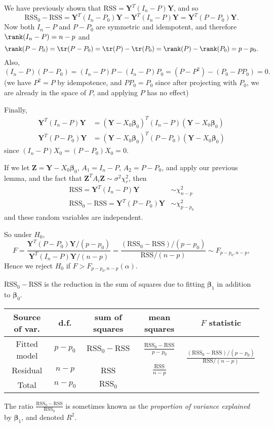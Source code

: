 \documentclass[a4paper]{article}
\begin{document}
We have previously shown that $\mathrm{RSS} = \mathbf{Y}^T(I_n - P)\mathbf{Y}$, and so
\[
  \mathrm{RSS}_0 - \mathrm{RSS} = \mathbf{Y}^T(I_n - P_0)\mathbf{Y} - \mathbf{Y}^T(I_n - P)\mathbf{Y} = \mathbf{Y}^T(P - P_0)\mathbf{Y}.
\]
Now both $I_n - P$ and $P - P_0$ are symmetric and idempotent, and therefore $\rank(I_n - P) = n - p$ and
\[
  \rank(P - P_0) = \tr(P - P_0) = \tr(P) - \tr(P_0) = \rank(P) - \rank(P_0) = p - p_0.
\]
Also,
\[
  (I_n - P)(P - P_0) = (I_n - P)P - (I_n - P)P_0 = (P - P^2) - (P_0 - PP_0) = 0.
\]
(we have $P^2 = P$ by idempotence, and $PP_0 = P_0$ since after projecting with $P_0$, we are already in the space of $P$, and applying $P$ has no effect)

Finally,
\begin{align*}
  \mathbf{Y}^T(I_n - P)\mathbf{Y} &= (\mathbf{Y} - X_0 \boldsymbol\beta_0)^T(I_n - P)(\mathbf{Y} - X_0 \boldsymbol\beta_0)\\
  \mathbf{Y}^T(P - P_0)\mathbf{Y} &= (\mathbf{Y} - X_0 \boldsymbol\beta_0)^T(P - P_0)(\mathbf{Y} - X_0 \boldsymbol\beta_0)
\end{align*}
since $(I_n - P)X_0 = (P - P_0)X_0 = 0$.

If we let $\mathbf{Z} = \mathbf{Y} - X_0 \boldsymbol\beta_0$, $A_1 = I_n - P$, $A_2 = P - P_0$, and apply our previous lemma, and the fact that $\mathbf{Z}^TA_i \mathbf{Z} \sim \sigma^2 \chi_r^2$, then
\begin{align*}
  \mathrm{RSS} = \mathbf{Y}^T(I_n - P)\mathbf{Y} &\sim \chi_{n - p}^2\\
  \mathrm{RSS}_0 - \mathrm{RSS} = \mathbf{Y}^T(P - P_0)\mathbf{Y} &\sim \chi^2_{p - p_0}
\end{align*}
and these random variables are independent.

So under $H_0$,
\[
  F = \frac{\mathbf{Y}^T(P - P_0)\mathbf{Y}/(p - p_0)}{\mathbf{Y}^T(I_n - P)\mathbf{Y}/(n - p)} = \frac{(\mathrm{RSS}_0 - \mathrm{RSS})/(p - p_0)}{\mathrm{RSS}/(n - p)} \sim F_{p - p_0, n - p},
\]
Hence we reject $H_0$ if $F > F_{p - p_0, n - p}(\alpha)$.

$\mathrm{RSS}_0 - \mathrm{RSS}$ is the reduction in the sum of squares due to fitting $\boldsymbol\beta_1$ in addition to $\boldsymbol\beta_0$.
\begin{center}
  \begin{tabular}{ccccc}
    \toprule
    Source of var. & d.f. & sum of squares & mean squares & $F$ statistic\\
    \midrule
    Fitted model & $p - p_0$ & $\mathrm{RSS}_0 - \mathrm{RSS}$ & $\frac{\mathrm{RSS}_0 - \mathrm{RSS}}{p - p_0}$ & \multirow{2}{*}{$\frac{(\mathrm{RSS}_0 - \mathrm{RSS})/(p - p_0)}{\mathrm{RSS}/(n - p)}$}\\
    Residual & $n - p$ & RSS & $\frac{\mathrm{RSS}}{n - p}$\\
    \midrule
    Total & $n - p_0$ & $\mathrm{RSS}_0$\\
    \bottomrule
  \end{tabular}
\end{center}
The ratio $\frac{\mathrm{RSS}_0 - \mathrm{RSS}}{\mathrm{RSS}_0}$ is sometimes known as the \emph{proportion of variance explained} by $\boldsymbol\beta_1$, and denoted $R^2$.
\end{document}
